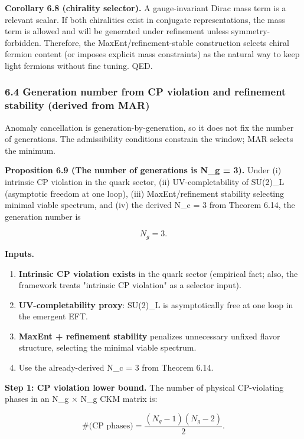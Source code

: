 \textbf{Corollary 6.8 (chirality selector).} A gauge-invariant Dirac mass term is a relevant scalar. If both chiralities exist in conjugate representations, the mass term is allowed and will be generated under refinement unless symmetry-forbidden. Therefore, the MaxEnt/refinement-stable construction selects chiral fermion content (or imposes explicit mass constraints) as the natural way to keep light fermions without fine tuning. QED.

\subsubsection{6.4 Generation number from CP violation and refinement stability (derived from MAR)}\label{64-generation-number-from-cp-violation-and-refinement-stability-derived-from-mar}

Anomaly cancellation is generation-by-generation, so it does not fix the number of generations. The admissibility conditions constrain the window; MAR selects the minimum.

\textbf{Proposition 6.9 (The number of generations is N\_g = 3).} Under (i) intrinsic CP violation in the quark sector, (ii) UV-completability of SU(2)\_L (asymptotic freedom at one loop), (iii) MaxEnt/refinement stability selecting minimal viable spectrum, and (iv) the derived N\_c = 3 from Theorem 6.14, the generation number is

\[
N_g = 3.
\]

\textbf{Inputs.}

\begin{enumerate}
\def\labelenumi{\arabic{enumi}.}
\tightlist
\item
  \textbf{Intrinsic CP violation exists} in the quark sector (empirical fact; also, the framework treats "intrinsic CP violation" as a selector input).
\item
  \textbf{UV-completability proxy}: SU(2)\_L is asymptotically free at one loop in the emergent EFT.
\item
  \textbf{MaxEnt + refinement stability} penalizes unnecessary unfixed flavor structure, selecting the minimal viable spectrum.
\item
  Use the already-derived N\_c = 3 from Theorem 6.14.
\end{enumerate}

\textbf{Step 1: CP violation lower bound.} The number of physical CP-violating phases in an N\_g × N\_g CKM matrix is:

\[
\#\text{(CP phases)} = \frac{(N_g - 1)(N_g - 2)}{2}.
\]

